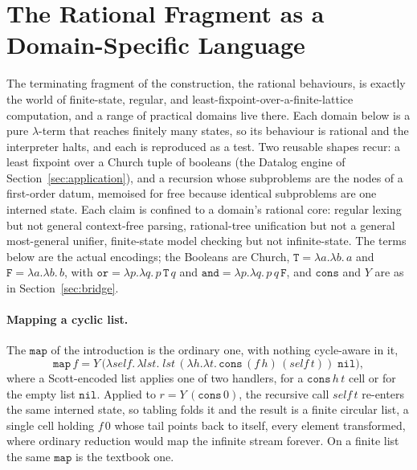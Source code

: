 \section{The Rational Fragment as a Domain-Specific Language}\label{app:dsl}
The terminating fragment of the construction, the rational behaviours, is exactly the world of
finite-state, regular, and least-fixpoint-over-a-finite-lattice computation, and a range of
practical domains live there. Each domain below is a pure $\lambda$-term that reaches finitely
many states, so its behaviour is rational and the interpreter halts, and each is reproduced as a
test. Two reusable shapes recur: a least fixpoint over a Church
tuple of booleans (the Datalog engine of Section~\ref{sec:application}), and a recursion whose
subproblems are the nodes of a first-order datum, memoised for free because identical subproblems
are one interned state. Each claim is confined to a domain's rational core: regular lexing but not
general context-free parsing, rational-tree unification but not a general most-general unifier,
finite-state model checking but not infinite-state. The terms below are the actual encodings; the
Booleans are Church, $\mathtt{T} = \lambda a.\lambda b.\,a$ and $\mathtt{F} = \lambda a.\lambda b.\,b$,
with $\mathtt{or} = \lambda p.\lambda q.\,p\,\mathtt{T}\,q$ and
$\mathtt{and} = \lambda p.\lambda q.\,p\,q\,\mathtt{F}$, and $\mathtt{cons}$ and $Y$ are as in
Section~\ref{sec:bridge}.

\paragraph{Mapping a cyclic list.}
The $\mathtt{map}$ of the introduction is the ordinary one, with nothing cycle-aware in it,
\[
  \mathtt{map}\,f = Y\,\big(\lambda\mathit{self}.\,\lambda\mathit{lst}.\;
  \mathit{lst}\,(\lambda h.\lambda t.\,\mathtt{cons}\,(f\,h)\,(\mathit{self}\,t))\;\mathtt{nil}\big),
\]
where a Scott-encoded list applies one of two handlers, for a $\mathtt{cons}\,h\,t$ cell or for
the empty list $\mathtt{nil}$. Applied to $r = Y\,(\mathtt{cons}\,0)$, the
recursive call $\mathit{self}\,t$ re-enters the same interned state, so tabling folds it and the
result is a finite circular list, a single cell holding $f\,0$ whose tail points back to itself,
every element transformed, where ordinary reduction would map the infinite stream forever. On a finite list the
same $\mathtt{map}$ is the textbook one.

